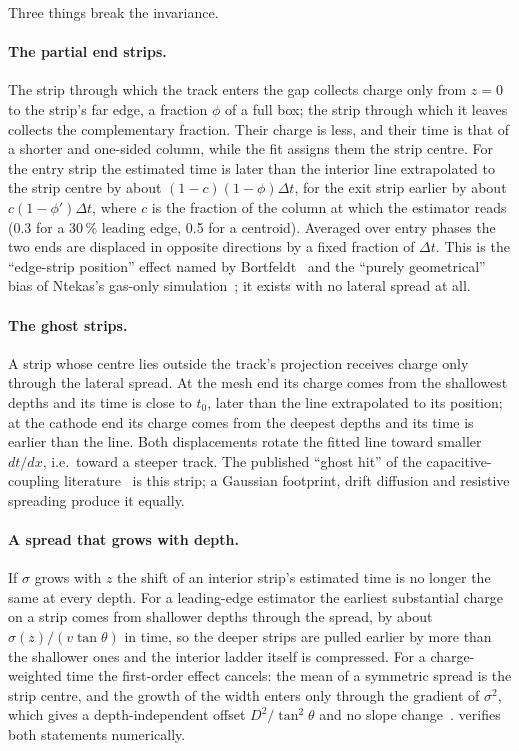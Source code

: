 Three things break the invariance.

\paragraph{The partial end strips.} The strip through which the track enters the gap collects charge only from $z = 0$ to the
strip's far edge, a fraction $\phi$ of a full box; the strip through which it leaves collects the complementary fraction. Their
charge is less, and their time is that of a shorter and one-sided column, while the fit assigns them the strip centre. For the
entry strip the estimated time is later than the interior line extrapolated to the strip centre by about $(1-c)(1-\phi)\Delta t$,
for the exit strip earlier by about $c(1-\phi')\Delta t$, where $c$ is the fraction of the column at which the estimator reads
(0.3 for a 30\,\% leading edge, 0.5 for a centroid). Averaged over entry phases the two ends are displaced in opposite
directions by a fixed fraction of $\Delta t$. This is the ``edge-strip position'' effect named by Bortfeldt~\cite{Bortfeldt2015}
and the ``purely geometrical'' bias of Ntekas's gas-only simulation~\cite{Ntekas2016}; it exists with no lateral spread at all.

\paragraph{The ghost strips.} A strip whose centre lies outside the track's projection receives charge only through the
lateral spread. At the mesh end its charge comes from the shallowest depths and its time is close to $t_0$, later than the line
extrapolated to its position; at the cathode end its charge comes from the deepest depths and its time is earlier than the
line. Both displacements rotate the fitted line toward smaller $dt/dx$, i.e.\ toward a steeper track. The published ``ghost
hit'' of the capacitive-coupling literature~\cite{Farinelli2019,Ntekas2016} is this strip; a Gaussian footprint, drift
diffusion and resistive spreading produce it equally.

\paragraph{A spread that grows with depth.} If $\sigma$ grows with $z$ the shift of an interior strip's estimated time is no
longer the same at every depth. For a leading-edge estimator the earliest substantial charge on a strip comes from shallower
depths through the spread, by about $\sigma(z)/(v\tan\theta)$ in time, so the deeper strips are pulled earlier by more than the
shallower ones and the interior ladder itself is compressed. For a charge-weighted time the first-order effect cancels: the
mean of a symmetric spread is the strip centre, and the growth of the width enters only through the gradient of $\sigma^2$,
which gives a depth-independent offset $D^2/\tan^2\theta$ and no slope change~\cite{paperII}.  verifies both
statements numerically.

